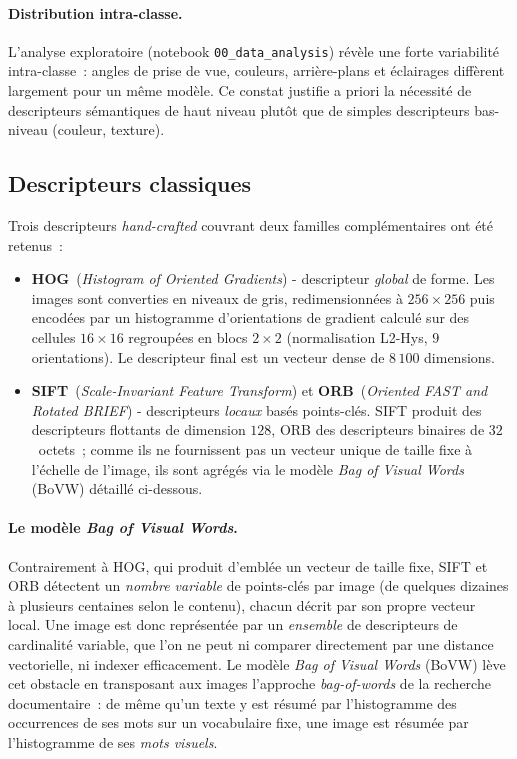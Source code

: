 \documentclass[a4paper,11pt]{article}
\begin{document}
\paragraph{Distribution intra-classe.}
L'analyse exploratoire (notebook \texttt{00\_data\_analysis}) révèle une
forte variabilité intra-classe~: angles de prise de vue, couleurs,
arrière-plans et éclairages diffèrent largement pour un même modèle. Ce
constat justifie a priori la nécessité de descripteurs sémantiques de
haut niveau plutôt que de simples descripteurs bas-niveau (couleur,
texture).

\subsection{Descripteurs classiques}
\label{subsec:classical}

Trois descripteurs \textit{hand-crafted} couvrant deux familles
complémentaires ont été retenus~:
\begin{itemize}
    \item \textbf{HOG}~(\textit{Histogram of Oriented Gradients}) -
    descripteur \emph{global} de forme. Les images sont converties en
    niveaux de gris, redimensionnées à $256\times 256$ puis encodées par
    un histogramme d'orientations de gradient calculé sur des cellules
    $16\times 16$ regroupées en blocs $2\times 2$ (normalisation
    L2-Hys, $9$ orientations). Le descripteur final est un vecteur dense
    de $8\,100$ dimensions.

    \item \textbf{SIFT}~(\textit{Scale-Invariant Feature Transform}) et
    \textbf{ORB}~(\textit{Oriented FAST and Rotated BRIEF}) - descripteurs
    \emph{locaux} basés points-clés. SIFT produit des descripteurs
    flottants de dimension $128$, ORB des descripteurs binaires de
    $32$~octets~; comme ils ne fournissent pas un vecteur unique de
    taille fixe à l'échelle de l'image, ils sont agrégés via le modèle
    \textit{Bag of Visual Words} (BoVW) détaillé ci-dessous.
\end{itemize}

\paragraph{Le modèle \textit{Bag of Visual Words}.}
Contrairement à HOG, qui produit d'emblée un vecteur de taille fixe,
SIFT et ORB détectent un \emph{nombre variable} de points-clés par
image (de quelques dizaines à plusieurs centaines selon le contenu),
chacun décrit par son propre vecteur local. Une image est donc
représentée par un \emph{ensemble} de descripteurs de cardinalité
variable, que l'on ne peut ni comparer directement par une distance
vectorielle, ni indexer efficacement. Le modèle \textit{Bag of Visual
Words} (BoVW) lève cet obstacle en transposant aux images l'approche
\textit{bag-of-words} de la recherche documentaire~: de même qu'un texte
y est résumé par l'histogramme des occurrences de ses mots sur un
vocabulaire fixe, une image est résumée par l'histogramme de ses
\emph{mots visuels}.
\end{document}
